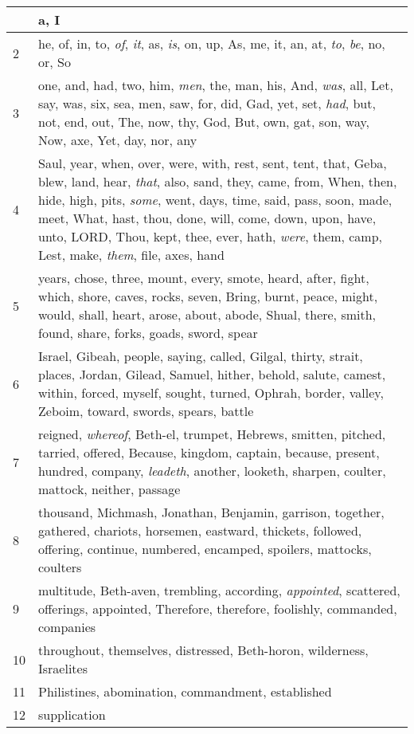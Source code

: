 \begin{longtable}{l|p{3.75in}}
\hline \hline
\endlastfoot
1 & a, I \\ \hline
2 & he, of, in, to, \emph{of}, \emph{it}, as, \emph{is}, on, up, As, me, it, an, at, \emph{to}, \emph{be}, no, or, So \\ \hline
3 & one, and, had, two, him, \emph{men}, the, man, his, And, \emph{was}, all, Let, say, was, six, sea, men, saw, for, did, Gad, yet, set, \emph{had}, but, not, end, out, The, now, thy, God, But, own, gat, son, way, Now, axe, Yet, day, nor, any \\ \hline
4 & Saul, year, when, over, were, with, rest, sent, tent, that, Geba, blew, land, hear, \emph{that}, also, sand, they, came, from, When, then, hide, high, pits, \emph{some}, went, days, time, said, pass, soon, made, meet, What, hast, thou, done, will, come, down, upon, have, unto, LORD, Thou, kept, thee, ever, hath, \emph{were}, them, camp, Lest, make, \emph{them}, file, axes, hand \\ \hline
5 & years, chose, three, mount, every, smote, heard, after, fight, which, shore, caves, rocks, seven, Bring, burnt, peace, might, would, shall, heart, arose, about, abode, Shual, there, smith, found, share, forks, goads, sword, spear \\ \hline
6 & Israel, Gibeah, people, saying, called, Gilgal, thirty, strait, places, Jordan, Gilead, Samuel, hither, behold, salute, camest, within, forced, myself, sought, turned, Ophrah, border, valley, Zeboim, toward, swords, spears, battle \\ \hline
7 & reigned, \emph{whereof}, Beth-el, trumpet, Hebrews, smitten, pitched, tarried, offered, Because, kingdom, captain, because, present, hundred, company, \emph{leadeth}, another, looketh, sharpen, coulter, mattock, neither, passage \\ \hline
8 & thousand, Michmash, Jonathan, Benjamin, garrison, together, gathered, chariots, horsemen, eastward, thickets, followed, offering, continue, numbered, encamped, spoilers, mattocks, coulters \\ \hline
9 & multitude, Beth-aven, trembling, according, \emph{appointed}, scattered, offerings, appointed, Therefore, therefore, foolishly, commanded, companies \\ \hline
10 & throughout, themselves, distressed, Beth-horon, wilderness, Israelites \\ \hline
11 & Philistines, abomination, commandment, established \\ \hline
12 & supplication \\ \hline
\end{longtable}






